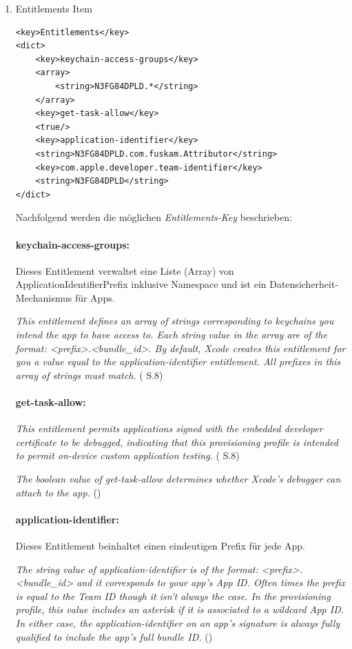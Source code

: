 \begin{enumerate}
    \item Entitlements Item
\begin{lstlisting}[captionpos=b, caption={Entitlements Item}]
<key>Entitlements</key>
<dict>
    <key>keychain-access-groups</key>
    <array>
        <string>N3FG84DPLD.*</string>           
    </array>
    <key>get-task-allow</key>
    <true/>
    <key>application-identifier</key>
    <string>N3FG84DPLD.com.fuskam.Attributor</string>
    <key>com.apple.developer.team-identifier</key>
    <string>N3FG84DPLD</string>
</dict>
\end{lstlisting}

Nachfolgend werden die möglichen \textit{\glqq Entitlements-Key\grqq{}} beschrieben:

\paragraph{keychain-access-groups:}
Dieses Entitlement verwaltet eine Liste (Array) von ApplicationIdentifierPrefix inklusive Namespace und ist ein Datensicherheit-Mechanismus für Apps. \par 
    \glqq \textit{This entitlement defines an array of strings corresponding to keychains you intend the app to have access to. Each string value in the array are of the format: <prefix>.<bundle\_id>. By default, Xcode creates this entitlement for you a value equal to the application-identifier entitlement. All prefixes in this array of strings must match.}\grqq{} (\cite{iOSSec[5]} S.8)

\paragraph{get-task-allow:} 
\glqq\textit{This entitlement permits applications signed with the embedded developer certificate to be debugged, indicating that this provisioning profile is intended to permit on-device custom application testing.}\grqq{} (\cite{iOSSec[5]} S.8) \par 
    \glqq \textit{The boolean value of get-task-allow determines whether Xcode's debugger can attach to the app.}\grqq{} (\cite{ProvisioningProfile[3]})

\paragraph{application-identifier:} Dieses Entitlement beinhaltet einen eindeutigen Prefix für jede App.\par
    \glqq \textit{The string value of application-identifier is of the format: <prefix>.<bundle\_id> and it corresponds to your app's App ID. Often times the prefix is equal to the Team ID though it isn't always the case. In the provisioning profile, this value includes an asterisk if it is associated to a wildcard App ID. In either case, the application-identifier on an app's signature is always fully qualified to include the app's full bundle ID.} \grqq{} (\cite{ProvisioningProfile[3]})


\end{enumerate}
